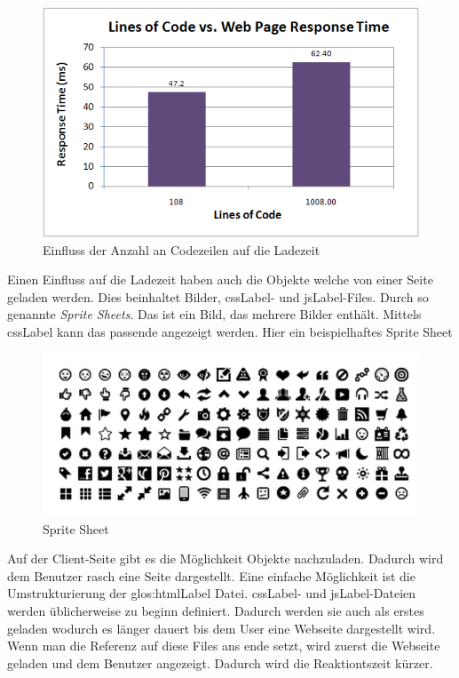 \begin{figure}[H]
	\centering
	\includegraphics[width=.8\linewidth]{images/lines-of-code-response-time.png}
	\caption{Einfluss der Anzahl an Codezeilen auf die Ladezeit}
	\label{fig:requirementsengineerin:nichtfunktionale:geschwindigkeit:loc}
\end{figure}

Einen Einfluss auf die Ladezeit haben auch die Objekte welche von einer Seite geladen werden. Dies beinhaltet Bilder, \gls{cssLabel}- und \gls{jsLabel}-Files. Durch so genannte \textit{Sprite Sheets}. Das ist ein Bild, das mehrere Bilder enthält. Mittels \gls{cssLabel} kann das passende angezeigt werden. Hier ein beispielhaftes Sprite Sheet

\begin{figure}[H]
	\centering
	\includegraphics[width=.6\linewidth]{images/sprite_sheet.png}
	\caption{Sprite Sheet}
	\label{fig:requirementsengineerin:nichtfunktionale:geschwindigkeit:spritesheet}
\end{figure}

Auf der Client-Seite gibt es die Möglichkeit Objekte nachzuladen. Dadurch wird dem Benutzer rasch eine Seite dargestellt. Eine einfache Möglichkeit ist die Umstrukturierung der \Gls{glos:htmlLabel} Datei. \gls{cssLabel}- und \gls{jsLabel}-Dateien werden üblicherweise zu beginn definiert. Dadurch werden sie auch als erstes geladen wodurch es länger dauert bis dem User eine Webseite dargestellt wird. Wenn man die Referenz auf diese Files ans ende setzt, wird zuerst die Webseite geladen und dem Benutzer angezeigt. Dadurch wird die Reaktiontszeit kürzer.

